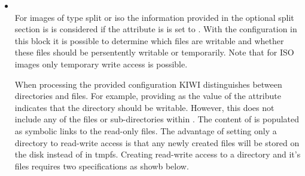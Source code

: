 \begin{itemize}
    In the event of a size specification that is too small for the
    generated image, KIWI will expand the size automatically unless the
    image size exceeds the specified size by 100\,MB or more. In this case
    KIWI will generate an error and exit.

    Should the given size exceed the necessary size for the image KIWI will
    not alter the image size as the free space might be required for proper
    execution of components within the image.

    If the size element is not used KIWI will create an image with
    containing approxiamtely 30\,\% free space.
    
     
	\begin{Command}{12cm}
	<size unit="M">1000</size>
	\end{Command}

\item {}\\
    For images of type split or iso the information provided in the optional
    split section is is considered if the  attribute is
    is set to . With the configuration in this block it is
    possible to determine which files are writable and whether these files
    should be persentently writable or temporarily. Note that for ISO images
    only temporary write access is possible.

    When processing the provided configuration KIWI distinguishes between
    directories and files. For example, providing  as the value of
    the  attribute indicates that the  directory should be
    writable. However, this does not include any of the files or 
    sub-directories within . The content of  is populated as 
    symbolic links to the read-only files. The advantage of setting only a
    directory to read-write access is that any newly created files will be
    stored on the disk instead of in tmpfs. Creating read-write access to a 
    directory and it's files requires two specifications as showb below.


\end{itemize}
